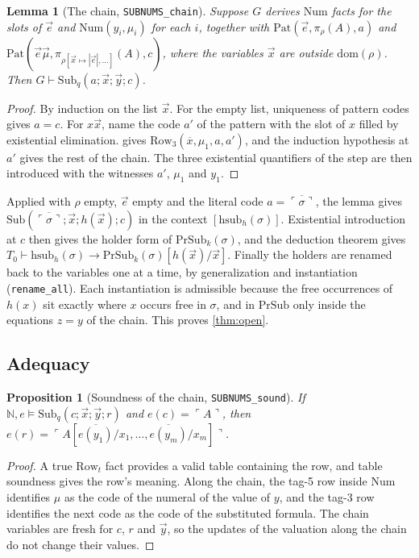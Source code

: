 \documentclass[11pt]{article}
\theoremstyle{plain}
\newtheorem{lemma}[theorem]{Lemma}
\newtheorem{proposition}[theorem]{Proposition}
\theoremstyle{definition}
\theoremstyle{remark}
\newcommand{\N}{\mathbb{N}}
\newcommand{\T}[1]{T_{#1}}
\newcommand{\gn}[1]{\ulcorner #1 \urcorner}
\newcommand{\num}[1]{\overline{#1}}
\newcommand{\Sub}{\mathrm{Sub}}
\newcommand{\PSub}{\mathrm{PrSub}}
\newcommand{\Row}{\mathrm{Row}}
\newcommand{\Num}{\mathrm{Num}}
\newcommand{\Pat}{\mathrm{Pat}}
\newcommand{\rocq}[1]{\texttt{#1}}
\newcommand{\sat}{\models}
\begin{document}
\begin{lemma}[The chain, \rocq{SUBNUMS\_chain}]\label{lem:chain}
Suppose $G$ derives $\Num$ facts for the slots of $\vec e$ and
$\Num(y_i, \mu_i)$ for each $i$, together with
$\Pat(\vec e, \pi_\rho(A), a)$ and
$\Pat(\vec e\vec\mu, \pi_{\rho[\vec x \mapsto |\vec e|,\ldots]}(A), c)$,
where the variables $\vec x$ are outside $\mathrm{dom}(\rho)$.  Then
$G \vdash \Sub_q(a; \vec x; \vec y; c)$.
\end{lemma}

\begin{proof}
By induction on the list $\vec x$.  For the empty list, uniqueness of
pattern codes gives $a = c$.  For $x\vec x$, name the code $a'$ of the
pattern with the slot of $x$ filled by existential elimination.
 gives $\Row_3(\num x, \mu_1, a, a')$, and the induction
hypothesis at $a'$ gives the rest of the chain.  The three existential
quantifiers of the step are then introduced with the witnesses $a'$,
$\mu_1$ and $y_1$.
\end{proof}

Applied with $\rho$ empty, $\vec e$ empty and the literal code
$a = \num{\gn\sigma}$, the lemma gives
$\Sub(\num{\gn\sigma}; \vec x; h(\vec x); c)$ in the context
$[\mathrm{hsub}_h(\sigma)]$.  Existential introduction at $c$ then gives
the holder form of $\PSub_k(\sigma)$, and the deduction theorem gives
$\T0 \vdash \mathrm{hsub}_h(\sigma) \to \PSub_k(\sigma)[h(\vec x)/\vec x]$.
Finally the holders are renamed back to the variables one at a time, by
generalization and instantiation (\rocq{rename\_all}).  Each
instantiation is admissible because the free occurrences of $h(x)$ sit
exactly where $x$ occurs free in $\sigma$, and in $\PSub$ only inside
the equations $z = y$ of the chain.  This proves \cref{thm:open}.

\subsection{Adequacy}\label{sec:adequacy}

\begin{proposition}[Soundness of the chain, \rocq{SUBNUMS\_sound}]
If $\N, e \sat \Sub_q(c; \vec x; \vec y; r)$ and $e(c) = \gn{A}$, then
$e(r) = \gn{A[\num{e(y_1)}/x_1,\dots,\num{e(y_m)}/x_m]}$.
\end{proposition}

\begin{proof}
A true $\Row_t$ fact provides a valid table containing the row, and table
soundness gives the row's meaning.  Along the chain, the tag-5 row inside
$\Num$ identifies $\mu$ as the code of the numeral of the value of $y$,
and the tag-3 row identifies the next code as the code of the
substituted formula.  The chain variables are fresh for $c$, $r$ and
$\vec y$, so the updates of the valuation along the chain do not change
their values.
\end{proof}
\end{document}
